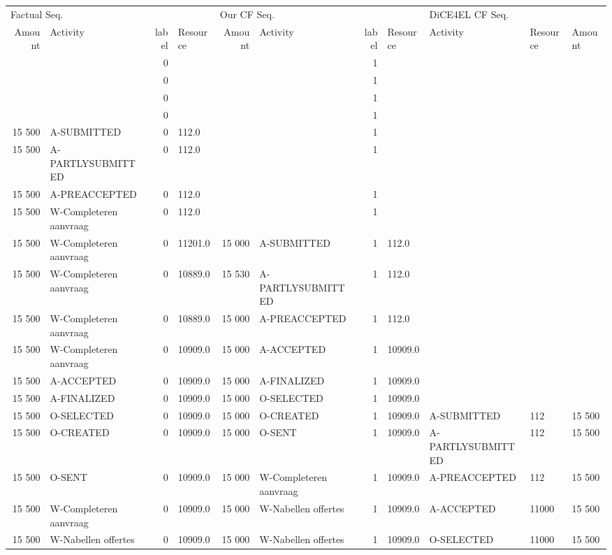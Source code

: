 \begin{tabular}{rlrlrlrllll}
\toprule
\multicolumn{4}{l}{Factual Seq.} & \multicolumn{4}{l}{Our CF Seq.} & \multicolumn{3}{l}{DiCE4EL CF Seq.} \\
Amount & Activity & label & Resource & Amount & Activity & label & Resource & Activity & Resource & Amount \\
\midrule
 &  & 0 &  &  &  & 1 &  &  &  &  \\
 &  & 0 &  &  &  & 1 &  &  &  &  \\
 &  & 0 &  &  &  & 1 &  &  &  &  \\
 &  & 0 &  &  &  & 1 &  &  &  &  \\
15 500 & A-SUBMITTED & 0 & 112.0 &  &  & 1 &  &  &  &  \\
15 500 & A-PARTLYSUBMITTED & 0 & 112.0 &  &  & 1 &  &  &  &  \\
15 500 & A-PREACCEPTED & 0 & 112.0 &  &  & 1 &  &  &  &  \\
15 500 & W-Completeren aanvraag & 0 & 112.0 &  &  & 1 &  &  &  &  \\
15 500 & W-Completeren aanvraag & 0 & 11201.0 & 15 000 & A-SUBMITTED & 1 & 112.0 &  &  &  \\
15 500 & W-Completeren aanvraag & 0 & 10889.0 & 15 530 & A-PARTLYSUBMITTED & 1 & 112.0 &  &  &  \\
15 500 & W-Completeren aanvraag & 0 & 10889.0 & 15 000 & A-PREACCEPTED & 1 & 112.0 &  &  &  \\
15 500 & W-Completeren aanvraag & 0 & 10909.0 & 15 000 & A-ACCEPTED & 1 & 10909.0 &  &  &  \\
15 500 & A-ACCEPTED & 0 & 10909.0 & 15 000 & A-FINALIZED & 1 & 10909.0 &  &  &  \\
15 500 & A-FINALIZED & 0 & 10909.0 & 15 000 & O-SELECTED & 1 & 10909.0 &  &  &  \\
15 500 & O-SELECTED & 0 & 10909.0 & 15 000 & O-CREATED & 1 & 10909.0 & A-SUBMITTED & 112 & 15 500 \\
15 500 & O-CREATED & 0 & 10909.0 & 15 000 & O-SENT & 1 & 10909.0 & A-PARTLYSUBMITTED & 112 & 15 500 \\
15 500 & O-SENT & 0 & 10909.0 & 15 000 & W-Completeren aanvraag & 1 & 10909.0 & A-PREACCEPTED & 112 & 15 500 \\
15 500 & W-Completeren aanvraag & 0 & 10909.0 & 15 000 & W-Nabellen offertes & 1 & 10909.0 & A-ACCEPTED & 11000 & 15 500 \\
15 500 & W-Nabellen offertes & 0 & 10909.0 & 15 000 & W-Nabellen offertes & 1 & 10909.0 & O-SELECTED & 11000 & 15 500 \\

\end{tabular}
